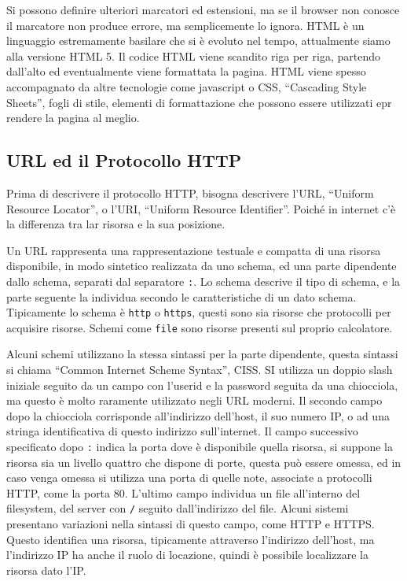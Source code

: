 \documentclass{article}
\numberwithin{equation}{subsection}
\begin{document}
Si possono definire ulteriori marcatori ed estensioni, ma se il browser non conosce il marcatore non produce errore, ma semplicemente lo ignora. 
HTML è un linguaggio estremamente basilare che si è evoluto nel tempo, attualmente siamo alla versione HTML 5. 
Il codice HTML viene scandito riga per riga, partendo dall'alto ed eventualmente viene formattata la pagina. HTML viene spesso accompagnato da altre tecnologie come 
javascript o CSS, ``Cascading Style Sheets'', fogli di stile, elementi di formattazione che possono essere utilizzati epr rendere la pagina al meglio. 

\subsection{URL ed il Protocollo HTTP}

Prima di descrivere il protocollo HTTP, bisogna descrivere l'URL, ``Uniform Resource Locator'', o l'URI, ``Uniform Resource Identifier''. Poiché in internet c'è la differenza 
tra lar risorsa e la sua posizione. 

Un URL rappresenta una rappresentazione testuale e compatta di una risorsa disponibile, in modo sintetico realizzata da uno schema, ed una parte dipendente dallo schema, 
separati dal separatore \verb|:|. 
Lo schema descrive il tipo di schema, e la parte seguente la individua secondo le caratteristiche di un dato schema. Tipicamente lo schema è \verb|http| o \verb|https|, 
questi sono sia risorse che protocolli per acquisire risorse. Schemi come \verb|file| sono risorse presenti sul proprio calcolatore. 



Alcuni schemi utilizzano la stessa sintassi per la parte dipendente, questa sintassi si chiama ``Common Internet Scheme Syntax'', CISS. SI utilizza un doppio slash iniziale 
seguito da un campo con l'userid e la password seguita da una chiocciola, ma questo è molto raramente utilizzato negli URL moderni. 
Il secondo campo dopo la chiocciola corrisponde all'indirizzo dell'host, il suo numero IP, o ad una stringa identificativa di questo indirizzo sull'internet. 
Il campo successivo specificato dopo \verb|:| indica la porta dove è disponibile quella risorsa, si suppone la risorsa sia un livello quattro che dispone di porte, 
questa può essere omessa, ed in caso venga omessa si utilizza una porta di quelle note, associate a protocolli HTTP, come la porta 80. L'ultimo campo individua un file 
all'interno del filesystem, del server con \verb|/| seguito dall'indirizzo del file. Alcuni sistemi presentano variazioni nella sintassi di questo campo, come HTTP e 
HTTPS. 
Questo identifica una risorsa, tipicamente attraverso l'indirizzo dell'host, ma l'indirizzo IP ha anche il ruolo di locazione, quindi è possibile localizzare la 
risorsa dato l'IP. 
\end{document}
